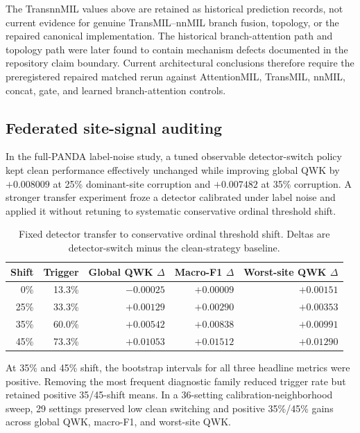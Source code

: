 \documentclass[10pt]{article}
\begin{document}
The TransnnMIL values above are retained as historical prediction records, not current evidence for genuine TransMIL--nnMIL branch fusion, topology, or the repaired canonical implementation. The historical branch-attention path and topology path were later found to contain mechanism defects documented in the repository claim boundary. Current architectural conclusions therefore require the preregistered repaired matched rerun against AttentionMIL, TransMIL, nnMIL, concat, gate, and learned branch-attention controls.

\subsection{Federated site-signal auditing}
In the full-PANDA label-noise study, a tuned observable detector-switch policy kept clean performance effectively unchanged while improving global QWK by $+0.008009$ at 25\% dominant-site corruption and $+0.007482$ at 35\% corruption. A stronger transfer experiment froze a detector calibrated under label noise and applied it without retuning to systematic conservative ordinal threshold shift.

\begin{table}[t]
\centering
\caption{Fixed detector transfer to conservative ordinal threshold shift. Deltas are detector-switch minus the clean-strategy baseline.}
\small
\begin{tabular}{rrrrr}
\toprule
Shift & Trigger & Global QWK $\Delta$ & Macro-F1 $\Delta$ & Worst-site QWK $\Delta$ \\
\midrule
0\% & 13.3\% & $-0.00025$ & $+0.00009$ & $+0.00151$ \\
25\% & 33.3\% & $+0.00129$ & $+0.00290$ & $+0.00353$ \\
35\% & 60.0\% & $+0.00542$ & $+0.00838$ & $+0.00991$ \\
45\% & 73.3\% & $+0.01053$ & $+0.01512$ & $+0.01290$ \\
\bottomrule
\end{tabular}
\label{tab:main_detector_transfer}
\end{table}

At 35\% and 45\% shift, the bootstrap intervals for all three headline metrics were positive. Removing the most frequent diagnostic family reduced trigger rate but retained positive 35/45-shift means. In a 36-setting calibration-neighborhood sweep, 29 settings preserved low clean switching and positive 35\%/45\% gains across global QWK, macro-F1, and worst-site QWK.
\end{document}

